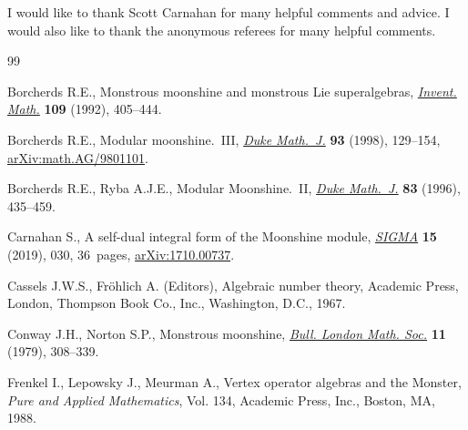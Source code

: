 \documentclass[pdftex]{sigma}%
\numberwithin{equation}{section}
\begin{document}
I would like to thank Scott Carnahan for many helpful comments and advice. I would also like to thank the anonymous referees for many helpful comments.

\begin{thebibliography}{99}
\footnotesize\itemsep=0pt

Borcherds R.E., Monstrous moonshine and monstrous {L}ie superalgebras,
 \href{https://doi.org/10.1007/BF01232032}{\textit{Invent. Math.}} \textbf{109} (1992), 405--444.

Borcherds R.E., Modular moonshine.~{III}, \href{https://doi.org/10.1215/S0012-7094-98-09305-X}{\textit{Duke Math.~J.}} \textbf{93}
 (1998), 129--154, \href{https://arxiv.org/abs/math.AG/9801101}{arXiv:math.AG/9801101}.

Borcherds R.E., Ryba A.J.E., Modular {M}oonshine.~{II}, \href{https://doi.org/10.1215/S0012-7094-96-08315-5}{\textit{Duke Math.~J.}}
 \textbf{83} (1996), 435--459.

Carnahan S., A self-dual integral form of the {M}oonshine module,
 \href{https://doi.org/10.3842/SIGMA.2019.030}{\textit{SIGMA}} \textbf{15} (2019), 030, 36~pages, \href{https://arxiv.org/abs/1710.00737}{arXiv:1710.00737}.

Cassels J.W.S., Fr\"ohlich A. (Editors), Algebraic number theory, Academic
 Press, London, Thompson Book Co., Inc., Washington, D.C., 1967.

Conway J.H., Norton S.P., Monstrous moonshine, \href{https://doi.org/10.1112/blms/11.3.308}{\textit{Bull. London Math. Soc.}}
 \textbf{11} (1979), 308--339.

Frenkel I., Lepowsky J., Meurman A., Vertex operator algebras and the
 {M}onster, \textit{Pure and Applied Mathematics}, Vol. 134, Academic Press,
 Inc., Boston, MA, 1988.

\end{thebibliography}\LastPageEnding
\end{document}
